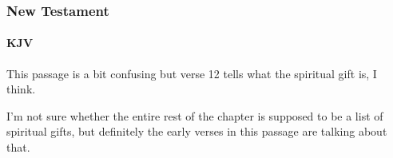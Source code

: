 			
		
		
	\subsubsection{New Testament} %
		\label{SPIRITUALGIFTS-NT}
	
		\paragraph{KJV}
			\label{SPIRITUALGIFTS-NT-KJV}		
	
			
			\begin{compactdesc}
				\item[{\hyperref[ROMANS-1-11]{Romans 1:11--12}}] \phantom{.}
					\begin{compactitem}
						\item This passage is a bit confusing but verse 12 tells what the spiritual gift is, I think.
					\end{compactitem}
				\item[{\hyperref[ROMANS-12-6]{Romans 12:6--21}}] \phantom{.}
					\begin{compactitem}
						\item I'm not sure whether the entire rest of the chapter is supposed to be a list of spiritual gifts, but definitely the early verses in this passage are talking about that.
					\end{compactitem}
			\end{compactdesc}
			
		
